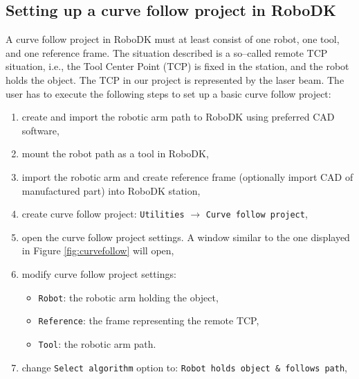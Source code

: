 \subsection{Setting up a curve follow project in RoboDK}

A curve follow project in RoboDK must at least consist of one robot, one tool, and one reference frame. The situation described is a so--called remote TCP situation, i.e., the Tool Center Point (TCP) is fixed in the station, and the robot holds the object. The TCP in our project is represented by the laser beam. 
The user has to execute the following steps to set up a basic curve follow project: 

\begin{enumerate}

\item create and import the robotic arm path to RoboDK using preferred CAD software,

\item mount the robot path as a tool in RoboDK,

\item import the robotic arm and create reference frame (optionally import CAD of manufactured part) into RoboDK station, 

\item create curve follow project: \texttt{Utilities} $\rightarrow$ \texttt{Curve follow project},

\item open the curve follow project settings. A window similar to the one displayed in Figure \ref{fig:curvefollow} will open, 

\item modify curve follow project settings:

    \begin{itemize}

        \item \texttt{Robot}: the robotic arm holding the object,
        \item \texttt{Reference}: the frame representing the remote TCP,
        \item \texttt{Tool}: the robotic arm path.
        
    \end{itemize}
    
\item change \texttt{Select algorithm} option to: \texttt{Robot holds object & follows path},


\end{enumerate}
